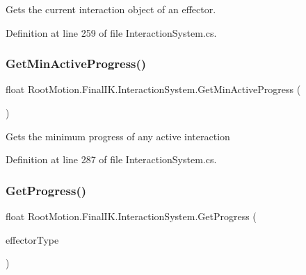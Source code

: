 Gets the current interaction object of an effector. 



Definition at line 259 of file Interaction\+System.\+cs.

\mbox{\label{class_root_motion_1_1_final_i_k_1_1_interaction_system_ace80fa123c986c5679575b9fe5c4fd4d}} 
\subsubsection{\texorpdfstring{Get\+Min\+Active\+Progress()}{GetMinActiveProgress()}}
{\footnotesize\ttfamily float Root\+Motion.\+Final\+I\+K.\+Interaction\+System.\+Get\+Min\+Active\+Progress (\begin{DoxyParamCaption}{ }\end{DoxyParamCaption})}



Gets the minimum progress of any active interaction 



Definition at line 287 of file Interaction\+System.\+cs.

\mbox{\label{class_root_motion_1_1_final_i_k_1_1_interaction_system_a54aeb2fd1eb7a0e15b410628709f4fbd}} 
\subsubsection{\texorpdfstring{Get\+Progress()}{GetProgress()}}
{\footnotesize\ttfamily float Root\+Motion.\+Final\+I\+K.\+Interaction\+System.\+Get\+Progress (\begin{DoxyParamCaption}\item[{\mbox{\hyperlink{namespace_root_motion_1_1_final_i_k_ae0dd2058c7667b6f132c11a6b860c14a}{Full\+Body\+Biped\+Effector}}}]{effector\+Type }\end{DoxyParamCaption})}



